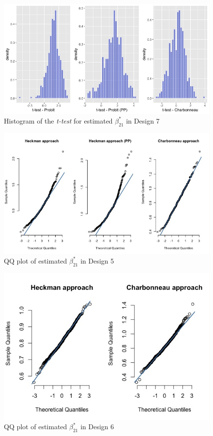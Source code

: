 \begin{figure}
  \centerline{\includegraphics[scale=.4]{content/Figures/ttest_beta21_Design7.png}}
  \caption{\footnotesize{Histogram of the \textit{t-test} for estimated $\beta_{21}^*$ in Design 7}}
  \label{ttest_beta21_Design7}
\end{figure}
\begin{figure}
  \centerline{\includegraphics[scale=.4]{content/Figures/QQ_beta_21_Design5.png}}
  \caption{\footnotesize{QQ plot of estimated $\beta_{21}^*$ in Design 5}}
  \label{QQ_beta_21_Design5}
\end{figure}
\begin{figure}
  \vspace{-2.5em}%
  \centerline{\includegraphics[scale=.4]{content/Figures/QQ_beta_21_Design6.png}}
  \caption{\footnotesize{QQ plot of estimated $\beta_{21}^*$ in Design 6}}
  \label{QQ_beta_21_Design6}
\end{figure}
